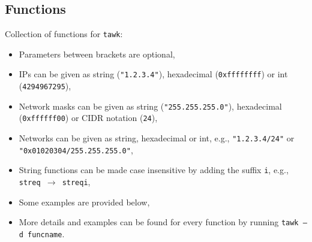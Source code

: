 \documentclass[documentation]{subfiles}
\begin{document}
\subsection{Functions}\label{funcs}
Collection of functions for {\tt tawk}:
\begin{itemize}
    \item Parameters between brackets are optional,
    \item IPs can be given as string ({\tt "1.2.3.4"}), hexadecimal ({\tt 0xffffffff}) or int ({\tt 4294967295}),
    \item Network masks can be given as string ({\tt "255.255.255.0"}), hexadecimal ({\tt 0xffffff00}) or CIDR notation ({\tt 24}),
    \item Networks can be given as string, hexadecimal or int, e.g., {\tt "1.2.3.4/24"} or {\tt "0x01020304/255.255.255.0"},
    \item String functions can be made case insensitive by adding the suffix {\tt i}, e.g., {\tt streq $\rightarrow$ streqi},
    \item Some examples are provided below,
    \item More details and examples can be found for every function by running {\tt tawk --d funcname}.
\end{itemize}
\end{document}
